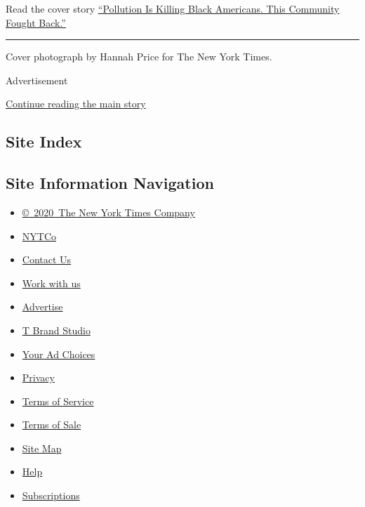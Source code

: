 Read the cover story
\href{https://www.nytimes.com/2020/07/28/magazine/pollution-philadelphia-black-americans.html}{``Pollution
Is Killing Black Americans. This Community Fought Back.''}

\begin{center}\rule{0.5\linewidth}{\linethickness}\end{center}

Cover photograph by Hannah Price for The New York Times.

Advertisement

\protect\hyperlink{after-bottom}{Continue reading the main story}

\hypertarget{site-index}{%
\subsection{Site Index}\label{site-index}}

\hypertarget{site-information-navigation}{%
\subsection{Site Information
Navigation}\label{site-information-navigation}}

\begin{itemize}
\tightlist
\item
  \href{https://help.nytimes.com/hc/en-us/articles/115014792127-Copyright-notice}{©~2020~The
  New York Times Company}
\end{itemize}

\begin{itemize}
\tightlist
\item
  \href{https://www.nytco.com/}{NYTCo}
\item
  \href{https://help.nytimes.com/hc/en-us/articles/115015385887-Contact-Us}{Contact
  Us}
\item
  \href{https://www.nytco.com/careers/}{Work with us}
\item
  \href{https://nytmediakit.com/}{Advertise}
\item
  \href{http://www.tbrandstudio.com/}{T Brand Studio}
\item
  \href{https://www.nytimes.com/privacy/cookie-policy\#how-do-i-manage-trackers}{Your
  Ad Choices}
\item
  \href{https://www.nytimes.com/privacy}{Privacy}
\item
  \href{https://help.nytimes.com/hc/en-us/articles/115014893428-Terms-of-service}{Terms
  of Service}
\item
  \href{https://help.nytimes.com/hc/en-us/articles/115014893968-Terms-of-sale}{Terms
  of Sale}
\item
  \href{https://spiderbites.nytimes.com}{Site Map}
\item
  \href{https://help.nytimes.com/hc/en-us}{Help}
\item
  \href{https://www.nytimes.com/subscription?campaignId=37WXW}{Subscriptions}
\end{itemize}

